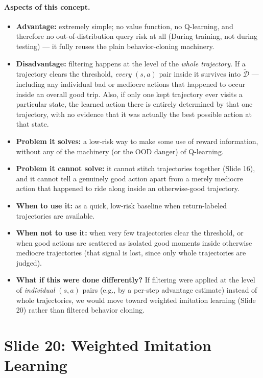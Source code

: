 \documentclass[11pt]{article}
\begin{document}
\paragraph{Aspects of this concept.}
\begin{itemize}
\item \textbf{Advantage:} extremely simple; no value function, no Q-learning, and
therefore no out-of-distribution query risk at all (During training, not during testing) --- it fully reuses the plain
behavior-cloning machinery.
\item \textbf{Disadvantage:} filtering happens at the level of the \emph{whole
trajectory}. If a trajectory clears the threshold, \emph{every} $(s,a)$ pair inside it
survives into $\widetilde{\mathcal{D}}$ --- including any individual bad or mediocre
actions that happened to occur inside an overall good trip. Also, if only one kept
trajectory ever visits a particular state, the learned action there is entirely
determined by that one trajectory, with no evidence that it was actually the best
possible action at that state.
\item \textbf{Problem it solves:} a low-risk way to make some use of reward
information, without any of the machinery (or the OOD danger) of Q-learning.
\item \textbf{Problem it cannot solve:} it cannot stitch trajectories together (Slide
16), and it cannot tell a genuinely good action apart from a merely mediocre action that
happened to ride along inside an otherwise-good trajectory.
\item \textbf{When to use it:} as a quick, low-risk baseline when return-labeled
trajectories are available.
\item \textbf{When not to use it:} when very few trajectories clear the threshold, or
when good actions are scattered as isolated good moments inside otherwise mediocre
trajectories (that signal is lost, since only whole trajectories are judged).
\item \textbf{What if this were done differently?} If filtering were applied at the
level of \emph{individual} $(s,a)$ pairs (e.g., by a per-step advantage estimate)
instead of whole trajectories, we would move toward weighted imitation learning (Slide
20) rather than filtered behavior cloning.
\end{itemize}

\section{Slide 20: Weighted Imitation Learning}
\end{document}
